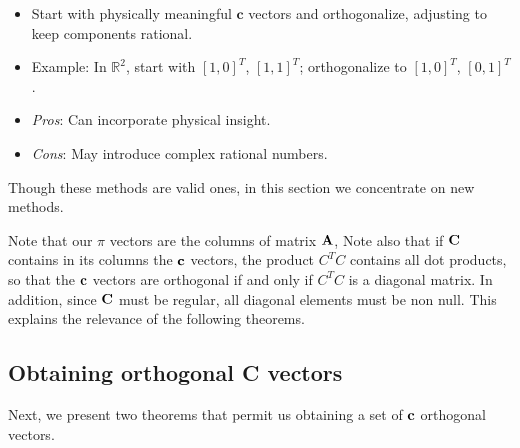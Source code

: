 \documentclass[
	11pt, %
	fleqn, %
	a4paper, %
]{LegrandOrangeBook}
\begin{document}
\begin{enumerate}
        \begin{itemize}
            \item Start with physically meaningful $\mathbf{c}$ vectors and orthogonalize, adjusting to keep components rational.
            \item Example: In $\mathbb{R}^2$, start with $[1, 0]^T$, $[1, 1]^T$; orthogonalize to $[1, 0]^T$, $[0, 1]^T$.
            \item \textit{Pros}: Can incorporate physical insight.
            \item \textit{Cons}: May introduce complex rational numbers.
        \end{itemize}
\end{enumerate}

Though these methods are valid ones, in this section we concentrate on new methods.

Note that our $\pi$ vectors are the columns of matrix ${\bf A}$, Note also that if ${\bf C}$ contains in its columns the ${\bf c}$ vectors, the product $C^T C$ contains all dot products, so that the ${\bf c}$ vectors are orthogonal if and only if $C^T C$ is a diagonal matrix. In addition, since ${\bf C}$
must be regular, all diagonal elements must be non null.  This explains the relevance of the following theorems.

\subsection{Obtaining orthogonal C vectors}
Next, we present two theorems that permit us obtaining a set of ${\bf c}$ orthogonal vectors.
\end{document}
